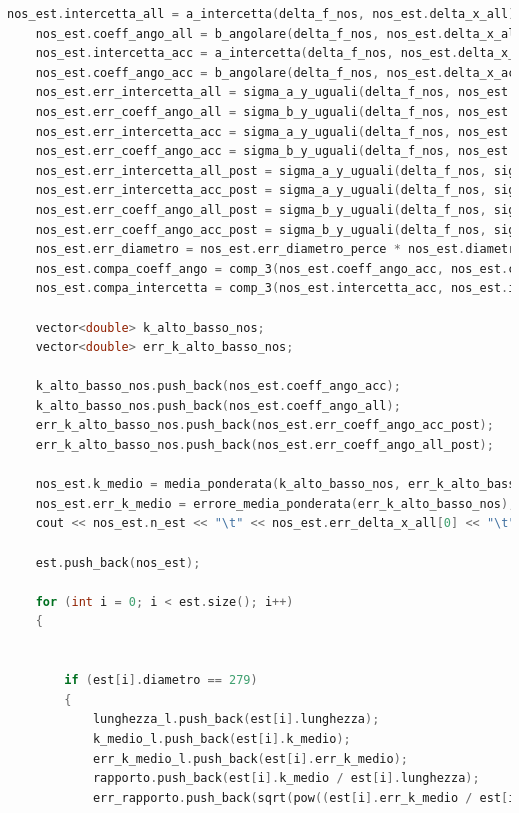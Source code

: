 \documentclass[a4paper,11pt,oneside]{article}
\begin{document}
\begin{lstlisting}[language=C++, label=lst:seconda_parte, caption=seconda\_parte]
	nos_est.intercetta_all = a_intercetta(delta_f_nos, nos_est.delta_x_all);				
	nos_est.coeff_ango_all = b_angolare(delta_f_nos, nos_est.delta_x_all);					
	nos_est.intercetta_acc = a_intercetta(delta_f_nos, nos_est.delta_x_acc);				
	nos_est.coeff_ango_acc = b_angolare(delta_f_nos, nos_est.delta_x_acc);					
	nos_est.err_intercetta_all = sigma_a_y_uguali(delta_f_nos, nos_est.err_delta_x_all[0]); 
	nos_est.err_coeff_ango_all = sigma_b_y_uguali(delta_f_nos, nos_est.err_delta_x_all[0]); 
	nos_est.err_intercetta_acc = sigma_a_y_uguali(delta_f_nos, nos_est.err_delta_x_acc[0]); 
	nos_est.err_coeff_ango_acc = sigma_b_y_uguali(delta_f_nos, nos_est.err_delta_x_acc[0]); 
	nos_est.err_intercetta_all_post = sigma_a_y_uguali(delta_f_nos, sigma_post_all);		
	nos_est.err_intercetta_acc_post = sigma_a_y_uguali(delta_f_nos, sigma_post_acc);
	nos_est.err_coeff_ango_all_post = sigma_b_y_uguali(delta_f_nos, sigma_post_all);
	nos_est.err_coeff_ango_acc_post = sigma_b_y_uguali(delta_f_nos, sigma_post_acc);
	nos_est.err_diametro = nos_est.err_diametro_perce * nos_est.diametro;
	nos_est.compa_coeff_ango = comp_3(nos_est.coeff_ango_acc, nos_est.coeff_ango_all, nos_est.err_coeff_ango_acc_post, nos_est.err_coeff_ango_all_post); 
	nos_est.compa_intercetta = comp_3(nos_est.intercetta_acc, nos_est.intercetta_all, nos_est.err_intercetta_acc_post, nos_est.err_intercetta_all_post);

	vector<double> k_alto_basso_nos;
	vector<double> err_k_alto_basso_nos;

	k_alto_basso_nos.push_back(nos_est.coeff_ango_acc);
	k_alto_basso_nos.push_back(nos_est.coeff_ango_all);
	err_k_alto_basso_nos.push_back(nos_est.err_coeff_ango_acc_post); 
	err_k_alto_basso_nos.push_back(nos_est.err_coeff_ango_all_post); 

	nos_est.k_medio = media_ponderata(k_alto_basso_nos, err_k_alto_basso_nos);
	nos_est.err_k_medio = errore_media_ponderata(err_k_alto_basso_nos);
	cout << nos_est.n_est << "\t" << nos_est.err_delta_x_all[0] << "\t" << nos_est.err_delta_x_acc[0] << endl;

	est.push_back(nos_est); 

	for (int i = 0; i < est.size(); i++)
	{
		
		
		if (est[i].diametro == 279) 
		{
			lunghezza_l.push_back(est[i].lunghezza);
			k_medio_l.push_back(est[i].k_medio);
			err_k_medio_l.push_back(est[i].err_k_medio);
			rapporto.push_back(est[i].k_medio / est[i].lunghezza);
			err_rapporto.push_back(sqrt(pow((est[i].err_k_medio / est[i].lunghezza), 2) + pow(((est[i].k_medio * est[i].err_lunghezza) / pow(est[i].lunghezza, 2)), 2)));
			

\end{lstlisting}
\end{document}
